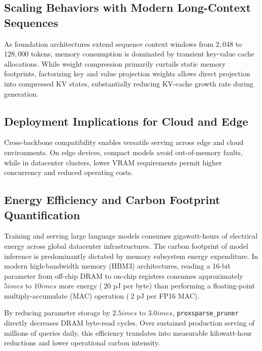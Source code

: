 \subsection{Scaling Behaviors with Modern Long-Context Sequences}
As foundation architectures extend sequence context windows from $2{,}048$ to $128{,}000$ tokens, memory consumption is dominated by transient key-value cache allocations. While weight compression primarily curtails static memory footprints, factorizing key and value projection weights allows direct projection into compressed KV states, substantially reducing KV-cache growth rate during generation.

\subsection{Deployment Implications for Cloud and Edge}
Cross-backbone compatibility enables versatile serving across edge and cloud environments. On edge devices, compact models avoid out-of-memory faults, while in datacenter clusters, lower VRAM requirements permit higher concurrency and reduced operating costs.

\subsection{Energy Efficiency and Carbon Footprint Quantification}
Training and serving large language models consumes gigawatt-hours of electrical energy across global datacenter infrastructures. The carbon footprint of model inference is predominantly dictated by memory subsystem energy expenditure. In modern high-bandwidth memory (HBM3) architectures, reading a 16-bit parameter from off-chip DRAM to on-chip registers consumes approximately $5	imes$ to $10	imes$ more energy ($~20$ pJ per byte) than performing a floating-point multiply-accumulate (MAC) operation ($~2$ pJ per FP16 MAC).

By reducing parameter storage by $2.5	imes$ to $3.0	imes$, \texttt{proxsparse\_pruner} directly decreases DRAM byte-read cycles. Over sustained production serving of millions of queries daily, this efficiency translates into measurable kilowatt-hour reductions and lower operational carbon intensity.
